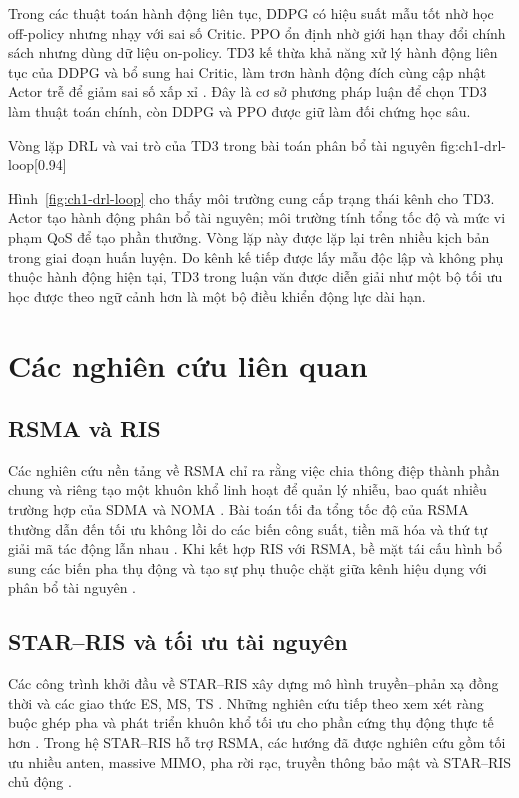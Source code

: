 Trong các thuật toán hành động liên tục, DDPG có hiệu suất mẫu tốt nhờ học off-policy nhưng nhạy với sai số Critic. PPO ổn định nhờ giới hạn thay đổi chính sách nhưng dùng dữ liệu on-policy. TD3 kế thừa khả năng xử lý hành động liên tục của DDPG và bổ sung hai Critic, làm trơn hành động đích cùng cập nhật Actor trễ để giảm sai số xấp xỉ \cite{Lillicrap2015DDPG,Fujimoto2018TD3}. Đây là cơ sở phương pháp luận để chọn TD3 làm thuật toán chính, còn DDPG và PPO được giữ làm đối chứng học sâu.

{Vòng lặp DRL và vai trò của TD3 trong bài toán phân bổ tài nguyên}
{fig:ch1-drl-loop}[0.94\linewidth]

Hình~\ref{fig:ch1-drl-loop} cho thấy môi trường cung cấp trạng thái kênh cho TD3. Actor tạo hành động phân bổ tài nguyên; môi trường tính tổng tốc độ và mức vi phạm QoS để tạo phần thưởng. Vòng lặp này được lặp lại trên nhiều kịch bản trong giai đoạn huấn luyện. Do kênh kế tiếp được lấy mẫu độc lập và không phụ thuộc hành động hiện tại, TD3 trong luận văn được diễn giải như một bộ tối ưu học được theo ngữ cảnh hơn là một bộ điều khiển động lực dài hạn.

\section{Các nghiên cứu liên quan}
\subsection{RSMA và RIS}
Các nghiên cứu nền tảng về RSMA chỉ ra rằng việc chia thông điệp thành phần chung và riêng tạo một khuôn khổ linh hoạt để quản lý nhiễu, bao quát nhiều trường hợp của SDMA và NOMA \cite{Mao2018RSMABridging,Mao2022RSMAFundamentals}. Bài toán tối đa tổng tốc độ của RSMA thường dẫn đến tối ưu không lồi do các biến công suất, tiền mã hóa và thứ tự giải mã tác động lẫn nhau \cite{Joudeh2016RSMASumRate}. Khi kết hợp RIS với RSMA, bề mặt tái cấu hình bổ sung các biến pha thụ động và tạo sự phụ thuộc chặt giữa kênh hiệu dụng với phân bổ tài nguyên \cite{Li2022RSMARISInterplay,Aboumahmoud2024RISRSMASurvey}.

\subsection{STAR--RIS và tối ưu tài nguyên}
Các công trình khởi đầu về STAR--RIS xây dựng mô hình truyền--phản xạ đồng thời và các giao thức ES, MS, TS \cite{Xu2021STARRIS,Mu2021STARAided}. Những nghiên cứu tiếp theo xem xét ràng buộc ghép pha và phát triển khuôn khổ tối ưu cho phần cứng thụ động thực tế hơn \cite{Liu2021STARCoupledPhase,Wang2022STAROptimization}. Trong hệ STAR--RIS hỗ trợ RSMA, các hướng đã được nghiên cứu gồm tối ưu nhiều anten, massive MIMO, pha rời rạc, truyền thông bảo mật và STAR--RIS chủ động \cite{Ge2024RSMAMassiveMIMO,Liu2024DiscretePhaseRSMARate,Hashempour2024SecureSTARRS,Maghrebi2024CooperativeActiveSTAR}.

